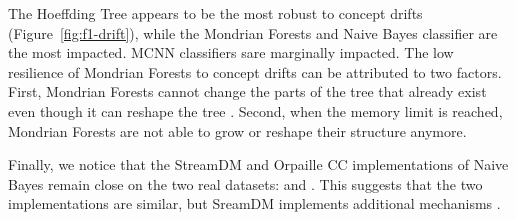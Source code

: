 The Hoeffding Tree appears to be the most robust to concept drifts
(Figure~\ref{fig:f1-drift}), while the Mondrian Forests and Naive Bayes
classifier are the most impacted. MCNN classifiers sare marginally impacted.
The low resilience of Mondrian Forests to concept drifts can be attributed
to two factors. First, Mondrian Forests cannot change the parts of the tree that
already exist even though it can reshape the tree . Second, when the
memory limit is reached, Mondrian Forests are not able to grow or reshape their structure anymore.

Finally, we notice that the StreamDM and Orpaille CC implementations of Naive Bayes remain close on the two real
datasets: \banosdataset and \recofitdataset {}. This suggests that the two
implementations are similar, but SreamDM implements additional mechanisms .



